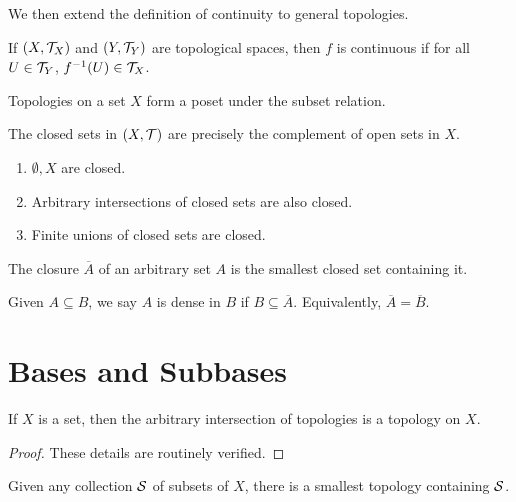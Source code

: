 We then extend the definition of continuity to general topologies.
\begin{definition}[Continuity]
    If $(X, \mathcal T_X)$ and $(Y, \mathcal T_Y)$ are topological spaces, then $f$ is continuous if for all $U \in \mathcal T_Y$, $f^{-1}(U) \in \mathcal T_X$.
\end{definition}

Topologies on a set $X$ form a poset under the subset relation.

\begin{definition}
    The closed sets in $(X, \mathcal T)$ are precisely the complement of open sets in $X$.
\end{definition}

\begin{proposition}
    \begin{enumerate}
        \item $\emptyset, X$ are closed.
        \item Arbitrary intersections of closed sets are also closed.
        \item Finite unions of closed sets are closed.
    \end{enumerate}
\end{proposition}

\begin{definition}[Closure]
    The closure $\overline A$ of an arbitrary set $A$ is the smallest closed set containing it.
\end{definition}

\begin{definition}[Density]
    Given $A \subseteq B$, we say $A$ is dense in $B$ if $B \subseteq \overline{A}$. Equivalently, $\overline{A} = \overline{B}$.
\end{definition}

\section{Bases and Subbases}

\begin{proposition}
    If $X$ is a set, then the arbitrary intersection of topologies is a topology on $X$.
\end{proposition}

\begin{proof}
    These details are routinely verified.
\end{proof}

\begin{corollary}
    Given any collection $\mathcal S$ of subsets of $X$, there is a smallest topology containing $\mathcal S$.
\end{corollary}

